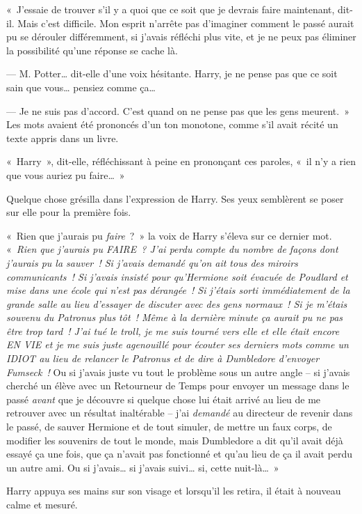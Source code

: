 «~J'essaie de trouver s'il y a quoi que ce soit que je devrais faire maintenant, dit-il. Mais c'est difficile. Mon esprit n'arrête pas d'imaginer comment le passé aurait pu se dérouler différemment, si j'avais réfléchi plus vite, et je ne peux pas éliminer la possibilité qu'une réponse se cache là.

--- M. Potter… dit-elle d'une voix hésitante. Harry, je ne pense pas que ce soit sain que vous… pensiez comme ça…

--- Je ne suis pas d'accord. C'est quand on ne pense pas que les gens meurent.~» Les mots avaient été prononcés d'un ton monotone, comme s'il avait récité un texte appris dans un livre.

«~Harry~», dit-elle, réfléchissant à peine en prononçant ces paroles, «~il n'y a rien que vous auriez pu faire…~»

Quelque chose grésilla dans l'expression de Harry. Ses yeux semblèrent se poser sur elle pour la première fois.

«~Rien que j'aurais pu \emph{faire}~?~» la voix de Harry s'éleva sur ce dernier mot. «~\emph{Rien que j'aurais pu FAIRE~? J'ai perdu compte du nombre de façons dont j'aurais pu la sauver~! Si j'avais demandé qu'on ait tous des miroirs communicants~! Si j'avais insisté pour qu'Hermione soit évacuée de Poudlard et mise dans une école qui n'est pas dérangée~! Si j'étais sorti immédiatement de la grande salle au lieu d'essayer de discuter avec des gens normaux~! Si je m'étais souvenu du Patronus plus tôt~! Même à la dernière minute ça aurait pu ne pas être trop tard~! J'ai tué le troll, je me suis tourné vers elle et elle était encore EN VIE et je me suis juste agenouillé pour écouter ses derniers mots comme un IDIOT au lieu de relancer le Patronus et de dire à Dumbledore d'envoyer Fumseck~!} Ou si j'avais juste vu tout le problème sous un autre angle -- si j'avais cherché un élève avec un Retourneur de Temps pour envoyer un message dans le passé \emph{avant} que je découvre si quelque chose lui était arrivé au lieu de me retrouver avec un résultat inaltérable -- j'ai \emph{demandé} au directeur de revenir dans le passé, de sauver Hermione et de tout simuler, de mettre un faux corps, de modifier les souvenirs de tout le monde, mais Dumbledore a dit qu'il avait déjà essayé ça une fois, que ça n'avait pas fonctionné et qu'au lieu de ça il avait perdu un autre ami. Ou si j'avais… si j'avais suivi… si, cette nuit-là…~»

Harry appuya ses mains sur son visage et lorsqu'il les retira, il était à nouveau calme et mesuré.

